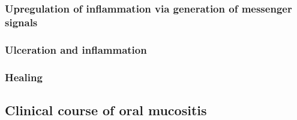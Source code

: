 \documentclass[
paper=landscape,
paper=160mm:90mm, %
fontsize=11pt, %
pagesize, %
parskip=half-, %
]{scrartcl} %
\theoremstyle{mythmstyle} %
\begin{document}
\clearpage
\subsubsection{Upregulation of inflammation via generation of messenger signals}

\subsubsection{Ulceration and inflammation}

\subsubsection{Healing}
\subsection{Clinical course of oral mucositis}
\end{document}
